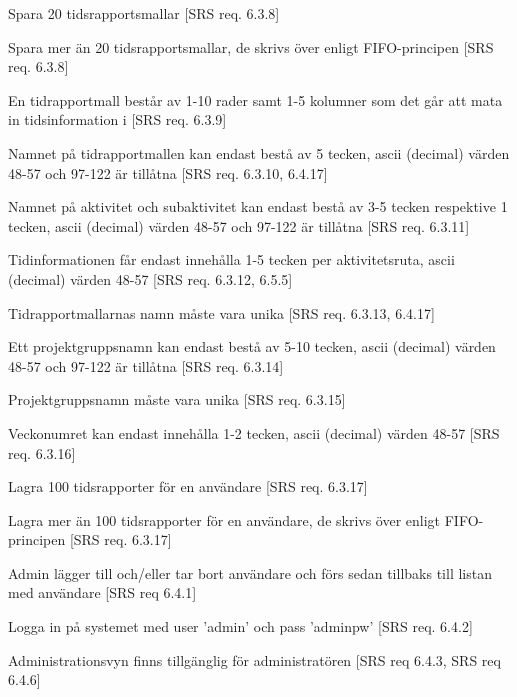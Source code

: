 \documentclass[a4paper]{article}
\begin{document}
\begin{appendices}
\begin{FT}
\item
Spara 20 tidsrapportsmallar [SRS req. 6.3.8]

\item
Spara mer än 20 tidsrapportsmallar, de skrivs över enligt FIFO-principen [SRS req. 6.3.8]

\item
En tidrapportmall består av 1-10 rader samt 1-5 kolumner som det går att mata in tidsinformation i [SRS req. 6.3.9]

\item
Namnet på tidrapportmallen kan endast bestå av 5 tecken, ascii (decimal) värden 48-57 och
97-122 är tillåtna [SRS req. 6.3.10, 6.4.17]

\item
Namnet på aktivitet och subaktivitet kan endast bestå av 3-5 tecken respektive 1 tecken, ascii (decimal) värden 48-57 och 97-122 är tillåtna [SRS req. 6.3.11]

\item
Tidinformationen får endast innehålla 1-5 tecken per aktivitetsruta, ascii (decimal) värden 48-57 [SRS req. 6.3.12, 6.5.5]

\item
Tidrapportmallarnas namn måste vara unika [SRS req. 6.3.13, 6.4.17]

\item
Ett projektgruppsnamn kan endast bestå av 5-10 tecken, ascii (decimal) värden 48-57 och
97-122 är tillåtna [SRS req. 6.3.14]

\item
Projektgruppsnamn måste vara unika [SRS req. 6.3.15]

\item
Veckonumret kan endast innehålla 1-2 tecken, ascii (decimal) värden 48-57 [SRS req. 6.3.16]

\item
Lagra 100 tidsrapporter för en användare [SRS req. 6.3.17]

\item
Lagra mer än 100 tidsrapporter för en användare, de skrivs över enligt FIFO-principen [SRS req. 6.3.17]

\item
Admin lägger till och/eller tar bort användare och förs sedan tillbaks till listan med användare [SRS req 6.4.1]

\item
Logga in på systemet med user 'admin' och pass 'adminpw' [SRS req. 6.4.2]

\item 
Administrationsvyn finns tillgänglig för administratören [SRS req 6.4.3, SRS req 6.4.6]


\end{FT}
\end{appendices}
\end{document}
